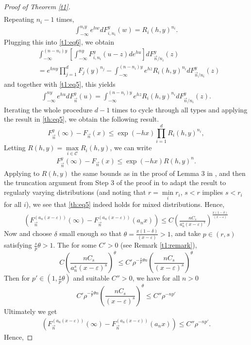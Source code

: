 \documentclass[12pt]{article}
\numberwithin{equation}{section}
\begin{document}
\begin{proof}[Proof of Theorem \ref{t1}]
\begin{align*}
\end{align*}
 Repeating $n_i-1$ times,
\begin{align*}
\int_{-\infty}^{n_i y}   e^{hw}dF^y_{i,n_i}(w) = R_i(h,y)^{n_i}.
\end{align*}
Plugging this into \eqref{t1:eq6}, we obtain 
\begin{align*}
    &\int_{-\infty}^{(n-n_i)y} \left[\int_{-\infty}^{ny} F^y_{i,n_i}(u-z)  d e^{hu}\right]dF^y_{\vec{n}/n_i}(z) \\&=
    e^{hny} \prod_{j=1}^d F_j(y)^{n_j} - \int_{-\infty}^{(n-n_i)y}e^{hz}R_i(h,y)^{n_i}dF^y_{\vec{n}/n_i}(z)
\end{align*}
and together with \eqref{t1:eq5}, this yields
\begin{align*}
\int_{-\infty}^{ny} e^{hu} d F^y_{\vec{n}}(u) =\int_{-\infty}^{(n-n_i)y}e^{hz}R_i(h,y)^{n_i}dF^y_{\vec{n}/n_i}(z).
\end{align*}
Iterating the whole procedure $d-1$ times to cycle through all types and applying the result in \eqref{th:eq5}, we obtain the following result.
\[
F^{y}_{\vec{n}} (\infty) - F^{}_{\vec{n}} ( x )\leq \exp(-hx) \prod_{i=1}^dR_i(h,y)^{n_i} ,\]
Letting $R(h,y) = \max\limits_{i \in \mathcal{C}} R_i(h,y)$, we can write
\begin{align*}
F^{y}_{\vec{n}} (\infty) - F^{}_{\vec{n}} ( x )\leq \exp(-hx) R(h,y)^{n}.
\end{align*}
Applying to $R(h,y)$ the same bounds as in the proof of Lemma 3 in \cite{Durrett2}, and then the truncation argument from Step 3 of the proof in \cite{Durrett1983} to adapt the result to regularly varying distributions (and noting that $r = \min\limits_{i}r_i$, $s<r$ implies $s<r_i$ for all $i$), we see that \eqref{th:eq5} indeed holds for mixed distributions. Hence,
\begin{align}\label{t1:eq8}
\left(F_{\vec{n}}^{(a_n (x - \varepsilon))}(\infty) - F_{\vec{n}}^{(a_n (x - \varepsilon))} (a_n x)\right) \leq C \left( \frac {n C_s} {a_{n}^s(x - \varepsilon)^s} \right)^{\frac {x(1-\delta)} {(x - \varepsilon)} }
\end{align}
Now and choose $\delta$ small enough so that $\theta = {\frac {x(1-\delta)} {(x - \varepsilon)} } >1$, and take $p \in (r,s)$ satisfying $\frac s p \theta > 1$. The for some $C'>0$ (see Remark \ref{t1:remark}),
\[
C \left( \frac {n C_s} {a_n^s(x - \varepsilon)^s} \right)^\theta \leq C'\rho^{- \frac s p \theta n} \left( \frac {n C_s} {(x - \varepsilon)^s} \right)^\theta
\]
Then for $p' \in (1, \frac s p \theta )$ and suitable $C'' >0$, we have for all $n>0$
\[
C' \rho^{- \frac s p \theta n} \left( \frac {n C_s} {(x - \varepsilon)^s} \right)^\theta   \leq C'' \rho^{-np'}
\]
Ultimately we get 
\begin{align*}
    \left(F_{\vec{n}}^{(a_n (x - \varepsilon))}(\infty) - F_{\vec{n}}^{(a_n (x - \varepsilon))} (a_n x) \right)\leq C'' \rho^{-np'}.
\end{align*}
Hence,


\end{proof}
\end{document}
